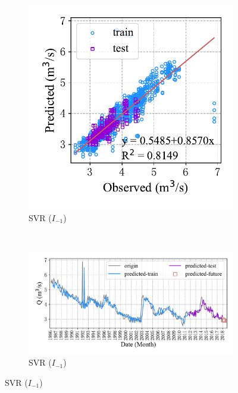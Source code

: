 \begin{figure}[!htbp]
  \centering
  \begin{subfigure}[b]{0.305\textwidth}
    \includegraphics[width=\textwidth]{Img/chap4_spr/spr_scatter_in_1_out_4_svr.pdf}
    \vspace{-1.2cm}
    \caption{SVR ($I_{-1}$)}
    \label{fig:spr_scatter_in_1_out_4_svr}
  \end{subfigure}
  ~
  \begin{subfigure}[b]{0.615\textwidth}
    \includegraphics[width=\textwidth]{Img/chap4_spr/spr_series_in_1_out_4_svr.pdf}
    \vspace{-1.2cm}
    \caption{SVR ($I_{-1}$)}
    \label{fig:spr_series_in_1_out_4_svr}
  \end{subfigure}

\end{figure}
